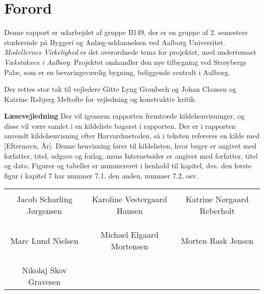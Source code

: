 \chapter*{Forord}
Denne rapport er udarbejdet af gruppe B149, der er en gruppe af 2. semesters studerende på Byggeri og Anlæg-uddannelsen ved Aalborg Universitet. \textit{Modellernes Virkelighed} er det overordnede tema for projektet, med undertemaet \textit{Vækstaksen i Aalborg}. Projektet omhandler den nye tilbygning ved Strøybergs Palæ, som er en bevaringsværdig bygning, beliggende centralt i Aalborg. 

Der rettes stor tak til vejledere Gitte Lyng Grønbech og Johan Clausen og Katrine Rabjerg Meltofte for vejledning og konstruktiv kritik. 

\textbf{Læsevejledning}
\newline
Der vil igennem rapporten fremtræde kildehenvisninger, og disse vil være samlet i en kildeliste bagerst i rapporten. Der er i rapporten anvendt kildehenvisning efter Harvardmetoden, så i teksten refereres en kilde med [Efternavn, År]. Denne henvisning fører til kildelisten, hvor bøger er angivet med forfatter, titel, udgave og forlag, mens Internetsider er angivet med forfatter, titel og dato. Figurer og tabeller er nummereret i henhold til kapitel, dvs. den første figur i kapitel 7 har nummer 7.1, den anden, nummer 7.2, osv. 

\phantom{Luft}

\phantom{Luft}

\begin{table}[H]
	\centering
		\begin{tabular}{c c c}
			\underline{\phantom{mmmmmmmmmmmmmm}} & \underline{\phantom{mmmmmmmmmmmmmm}} & \underline{\phantom{mmmmmmmmmmmmmm}} \\
			Jacob Scharling Jørgensen			& Karoline Vestergaard Hansen 		& Katrine Nørgaard Reberholt 			\\
			&&\\
			&&\\
			\underline{\phantom{mmmmmmmmmmmmmm}} & \underline{\phantom{mmmmmmmmmmmmmm}} & \underline{\phantom{mmmmmmmmmmmmmm}} \\
			Marc Lund Nielsen			& Michael Elgaard Mortensen 		& Morten Rask Jensen 				\\
			&&\\
			&&\\
			\underline{\phantom{mmmmmmmmmmmmmm}} \\
			Nikolaj Skov Gravesen						
		\end{tabular}
\end{table}